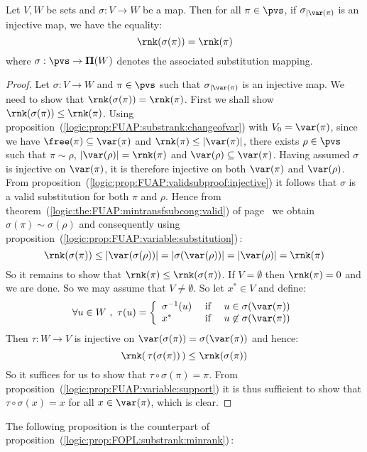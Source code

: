 \begin{prop}\label{logic:prop:FUAP:substrank:injective}
Let $V,W$ be sets and $\sigma:V\to W$ be a map. Then for all
$\pi\in\pvs$, if $\sigma_{|\var(\pi)}$ is an injective map, we have
the equality:
    \[
    \rnk(\sigma(\pi))=\rnk(\pi)
    \]
where $\sigma:\pvs\to{\bf\Pi}(W)$ denotes the associated
substitution mapping.
\end{prop}
\begin{proof}
Let $\sigma:V\to W$ and $\pi\in\pvs$ such that $\sigma_{|\var(\pi)}$
is an injective map. We need to show that
$\rnk(\sigma(\pi))=\rnk(\pi)$. First we shall show
$\rnk(\sigma(\pi))\leq\rnk(\pi)$. Using
proposition~(\ref{logic:prop:FUAP:substrank:changeofvar}) with
$V_{0}=\var(\pi)$, since we have $\free(\pi)\subseteq\var(\pi)$ and
$\rnk(\pi)\leq|\var(\pi)|$, there exists $\rho\in\pvs$ such that
$\pi\sim\rho$, $|\var(\rho)|=\rnk(\pi)$ and
$\var(\rho)\subseteq\var(\pi)$. Having assumed $\sigma$ is injective
on $\var(\pi)$, it is therefore injective on both $\var(\pi)$ and
$\var(\rho)$. From
proposition~(\ref{logic:prop:FUAP:validsubproof:injective}) it
follows that $\sigma$ is a valid substitution for both $\pi$ and
$\rho$. Hence from
theorem~(\ref{logic:the:FUAP:mintransfsubcong:valid}) of
page~\pageref{logic:the:FUAP:mintransfsubcong:valid} we obtain
$\sigma(\pi)\sim\sigma(\rho)$ and consequently using
proposition~(\ref{logic:prop:FUAP:variable:substitution})\,:
    \[
    \rnk(\sigma(\pi))\leq|\var(\sigma(\rho))|=|\sigma(\var(\rho))|
    =|\var(\rho)|=\rnk(\pi)
    \]
So it remains to show that $\rnk(\pi)\leq\rnk(\sigma(\pi))$. If
$V=\emptyset$ then $\rnk(\pi)=0$ and we are done. So we may assume
that $V\neq\emptyset$. So let $x^{*}\in V$ and define:
    \[
    \forall u\in W\ ,\ \tau(u)=\left\{
        \begin{array}{lcl}
        \sigma^{-1}(u)&\mbox{\ if\ }&u\in\sigma(\var(\pi))\\
        x^{*}&\mbox{\ if\ }&u\not\in\sigma(\var(\pi))
        \end{array}
    \right.
    \]
Then $\tau:W\to V$ is injective on
$\var(\sigma(\pi))=\sigma(\var(\pi))$ and hence:
    \[
    \rnk(\,\tau(\sigma(\pi))\,)\leq\rnk(\sigma(\pi))
    \]
So it suffices for us to show that  $\tau\circ\sigma(\pi)=\pi$. From
proposition~(\ref{logic:prop:FUAP:variable:support}) it is thus
sufficient to show that $\tau\circ\sigma(x)=x$ for all
$x\in\var(\pi)$, which is clear.
\end{proof}

The following proposition is the counterpart of
proposition~(\ref{logic:prop:FOPL:substrank:minrank})\,:

